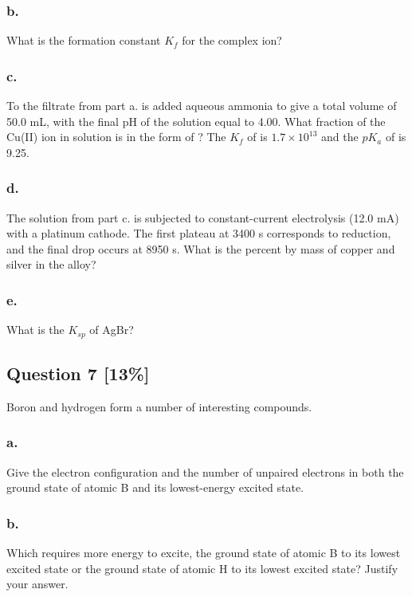 \documentclass[11pt,letterpaper]{article}
\begin{document}
\subsubsection*{b.}
What is the formation constant $K_f$ for the  complex ion?
\vspace{4cm}

\subsubsection*{c.}
To the filtrate from part a. is added aqueous ammonia to give a total volume of 50.0 mL, with the final pH of the solution equal to 4.00. What fraction of the Cu(II) ion in solution is in the form of ? The $K_f$ of  is $1.7 \times 10^{13}$ and the $pK_a$ of  is 9.25.
\vspace{4cm}

\subsubsection*{d.}
The solution from part c. is subjected to constant-current electrolysis (12.0 mA) with a platinum cathode. The first plateau at 3400 s corresponds to  reduction, and the final drop occurs at 8950 s. What is the percent by mass of copper and silver in the alloy?
\vspace{4cm}

\subsubsection*{e.}
What is the $K_{sp}$ of AgBr?
\vspace{4cm}

\newpage
\subsection*{Question 7 [13\%]}
Boron and hydrogen form a number of interesting compounds.

\subsubsection*{a.}
Give the electron configuration and the number of unpaired electrons in both the ground state of atomic B and its lowest-energy excited state.
\vspace{3cm}

\subsubsection*{b.}
Which requires more energy to excite, the ground state of atomic B to its lowest excited state or the ground state of atomic H to its lowest excited state? Justify your answer.
\vspace{3cm}
\end{document}
